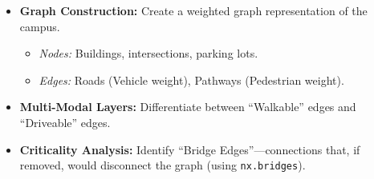 \documentclass[
  letterpaper,
  DIV=11,
  numbers=noendperiod]{scrreprt}
\providecommand{\tightlist}{%
  \setlength{\itemsep}{0pt}\setlength{\parskip}{0pt}}
\begin{document}
\begin{itemize}
\tightlist
\item
  \textbf{Graph Construction:} Create a weighted graph representation of
  the campus.

  \begin{itemize}
  \tightlist
  \item
    \emph{Nodes:} Buildings, intersections, parking lots.
  \item
    \emph{Edges:} Roads (Vehicle weight), Pathways (Pedestrian weight).
  \end{itemize}
\item
  \textbf{Multi-Modal Layers:} Differentiate between ``Walkable'' edges
  and ``Driveable'' edges.
\item
  \textbf{Criticality Analysis:} Identify ``Bridge Edges''---connections
  that, if removed, would disconnect the graph (using
  \texttt{nx.bridges}).
\end{itemize}
\end{document}
